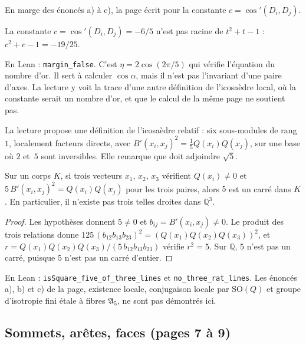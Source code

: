 En marge des énoncés a) à c), la page écrit  pour la constante $c = \cos'(D_i, D_j)$.

\begin{encadre}
\begin{contrexemple}
La constante $c = \cos'(D_i, D_j) = -6/5$ n'est pas racine de $t^2 + t - 1$ : $c^2 + c - 1 = -19/25$.
\end{contrexemple}
\end{encadre}

\noindent En Lean : \texttt{margin\_false}. C'est $\eta = 2\cos(2\pi/5)$ qui vérifie l'équation du nombre d'or. Il sert à calculer $\cos\alpha$, mais il n'est pas l'invariant d'une paire d'axes. La lecture y voit la trace d'une autre définition de l'icosaèdre local, où la constante serait un nombre d'or, et que le calcul de la même page ne soutient pas.

La lecture propose une définition de l'icosaèdre relatif : six sous-modules de rang~$1$, localement facteurs directs, avec $B'(x_i, x_j)^2 = \frac15 Q(x_i)Q(x_j)$, sur une base où $2$ et~$5$ sont inversibles. Elle remarque que  doit adjoindre $\sqrt5$.

\begin{enonce}
Sur un corps $K$, si trois vecteurs $x_1$, $x_2$, $x_3$ vérifient $Q(x_i) \neq 0$ et $5\,B'(x_i, x_j)^2 = Q(x_i)Q(x_j)$ pour les trois paires, alors $5$ est un carré dans $K$. En particulier, il n'existe pas trois telles droites dans $\mathbb Q^3$.
\end{enonce}

\begin{proof}
Les hypothèses donnent $5 \neq 0$ et $b_{ij} = B'(x_i, x_j) \neq 0$. Le produit des trois relations donne $125\,(b_{12}b_{13}b_{23})^2 = (Q(x_1)Q(x_2)Q(x_3))^2$, et $r = Q(x_1)Q(x_2)Q(x_3)/(5\,b_{12}b_{13}b_{23})$ vérifie $r^2 = 5$. Sur $\mathbb Q$, $5$ n'est pas un carré, puisque $5$ n'est pas un carré d'entier.
\end{proof}

\noindent En Lean : \texttt{isSquare\_five\_of\_three\_lines} et \texttt{no\_three\_rat\_lines}. Les énoncés a), b) et c) de la page, existence locale, conjugaison locale par $\mathrm{SO}(Q)$ et groupe d'isotropie fini étale à fibres $\mathfrak A_5$, ne sont pas démontrés ici.

\subsection*{Sommets, arêtes, faces (pages 7 à 9)}

